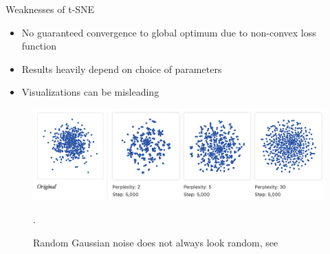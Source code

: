 \begin{frame}{Weaknesses of t-SNE}
    \begin{itemize}
        \item No guaranteed convergence to global optimum due to non-convex loss function 
        \item Results heavily depend on choice of parameters 
        \item Visualizations can be misleading  
    \end{itemize}
    \begin{figure}
        \centering
        \includegraphics[width=\textwidth]{misread_tsne_2.png}
        \caption{Random Gaussian noise does not always look random, see \cite{wattenberg2016how}}. 
    \end{figure}
\end{frame}

